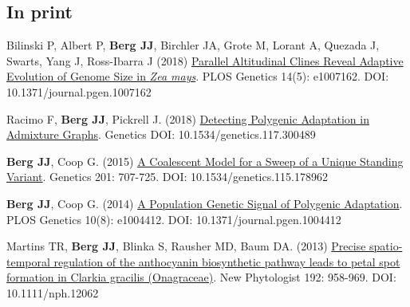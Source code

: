 \documentclass[letterpaper]{article}
\begin{document}
\subsection*{In print}
\begin{etaremune}
  \item Bilinski P, Albert P, \textbf{Berg JJ}, Birchler JA, Grote M, Lorant A, Quezada J, Swarts, Yang J, Ross-Ibarra J (2018) \href{https://journals.plos.org/plosgenetics/article?id=10.1371/journal.pgen.1007162}{Parallel Altitudinal Clines Reveal Adaptive Evolution of Genome Size in \textit{Zea mays}}. PLOS Genetics 14(5): e1007162. DOI: 10.1371/journal.pgen.1007162
  \item Racimo F, {\bf Berg JJ}, Pickrell J. (2018) \href{http://www.genetics.org/content/early/2018/01/18/genetics.117.300489}{Detecting Polygenic Adaptation in Admixture Graphs}. Genetics DOI: 10.1534/genetics.117.300489
\item {\bf Berg JJ}, Coop G. (2015)  \href{http://www.genetics.org/content/201/2/707}{A Coalescent Model for a Sweep of a Unique Standing Variant}. Genetics 201: 707-725. DOI: 10.1534/genetics.115.178962
\item {\bf Berg JJ}, Coop G. (2014)  \href{https://journals.plos.org/plosgenetics/article?id=10.1371/journal.pgen.1004412}{A Population Genetic Signal of Polygenic Adaptation}. PLOS Genetics 10(8): e1004412. DOI: 10.1371/journal.pgen.1004412
\item Martins TR,  {\bf Berg JJ}, Blinka S, Rausher MD, Baum DA. (2013) \href{https://nph.onlinelibrary.wiley.com/doi/full/10.1111/nph.12062}{Precise spatio-temporal regulation of the anthocyanin biosynthetic pathway leads to petal spot formation in Clarkia gracilis (Onagraceae)}. New Phytologist 192: 958-969. DOI: 10.1111/nph.12062 


\end{etaremune}
\end{document}
